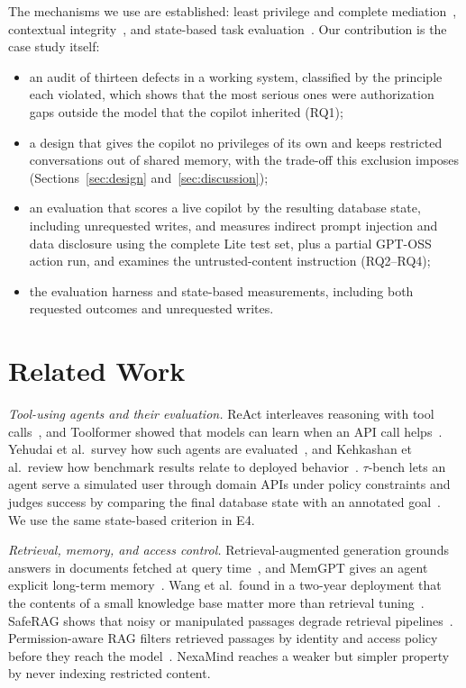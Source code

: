 \documentclass[conference]{IEEEtran}
\begin{document}
The mechanisms we use are established: least privilege and complete mediation~\cite{saltzer1975protection}, contextual integrity~\cite{nissenbaum2004contextual}, and state-based task evaluation~\cite{yao2024taubench}. Our contribution is the case study itself:
\begin{itemize}
\item an audit of thirteen defects in a working system, classified by the principle each violated, which shows that the most serious ones were authorization gaps outside the model that the copilot inherited (RQ1);
\item a design that gives the copilot no privileges of its own and keeps restricted conversations out of shared memory, with the trade-off this exclusion imposes (Sections~\ref{sec:design} and~\ref{sec:discussion});
\item an evaluation that scores a live copilot by the resulting database state, including unrequested writes, and measures indirect prompt injection and data disclosure using the complete Lite test set, plus a partial GPT-OSS action run, and examines the untrusted-content instruction (RQ2--RQ4);
\item the evaluation harness and state-based measurements, including both requested outcomes and unrequested writes.
\end{itemize}

\section{Related Work}

\textit{Tool-using agents and their evaluation.} ReAct interleaves reasoning with tool calls~\cite{yao2023react}, and Toolformer showed that models can learn when an API call helps~\cite{schick2023toolformer}. Yehudai et al.\ survey how such agents are evaluated~\cite{yehudai2026survey}, and Kehkashan et al.\ review how benchmark results relate to deployed behavior~\cite{kehkashan2026review}. $\tau$-bench lets an agent serve a simulated user through domain APIs under policy constraints and judges success by comparing the final database state with an annotated goal~\cite{yao2024taubench}. We use the same state-based criterion in E4.

\textit{Retrieval, memory, and access control.} Retrieval-augmented generation grounds answers in documents fetched at query time~\cite{lewis2020rag}, and MemGPT gives an agent explicit long-term memory~\cite{packer2023memgpt}. Wang et al.\ found in a two-year deployment that the contents of a small knowledge base matter more than retrieval tuning~\cite{wang2025reliable}. SafeRAG shows that noisy or manipulated passages degrade retrieval pipelines~\cite{liang2025saferag}. Permission-aware RAG filters retrieved passages by identity and access policy before they reach the model~\cite{jeong2025permission}. NexaMind reaches a weaker but simpler property by never indexing restricted content.
\end{document}
